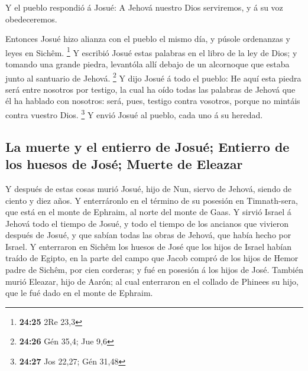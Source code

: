  Y el pueblo respondió á Josué: A Jehová nuestro Dios
serviremos, y á su voz obedeceremos.

 Entonces Josué hizo alianza con el pueblo el mismo día,
y púsole ordenanzas y leyes en Sichêm. \footnote{\textbf{24:25} 2Re 23,3}
 Y escribió Josué estas palabras en el libro de la ley de
Dios; y tomando una grande piedra, levantóla allí debajo de un
alcornoque que estaba junto al santuario de Jehová. \footnote{\textbf{24:26}
  Gén 35,4; Jue 9,6}  Y dijo Josué á todo el pueblo: He
aquí esta piedra será entre nosotros por testigo, la cual ha oído todas
las palabras de Jehová que él ha hablado con nosotros: será, pues,
testigo contra vosotros, porque no mintáis contra vuestro Dios.
\footnote{\textbf{24:27} Jos 22,27; Gén 31,48}  Y envió
Josué al pueblo, cada uno á su heredad.

\hypertarget{la-muerte-y-el-entierro-de-josuuxe9-entierro-de-los-huesos-de-josuxe9-muerte-de-eleazar}{%
\subsection{La muerte y el entierro de Josué; Entierro de los huesos de
José; Muerte de
Eleazar}\label{la-muerte-y-el-entierro-de-josuuxe9-entierro-de-los-huesos-de-josuxe9-muerte-de-eleazar}}

 Y después de estas cosas murió Josué, hijo de Nun,
siervo de Jehová, siendo de ciento y diez años.  Y
enterráronlo en el término de su posesión en Timnath-sera, que está en
el monte de Ephraim, al norte del monte de Gaas.  Y
sirvió Israel á Jehová todo el tiempo de Josué, y todo el tiempo de los
ancianos que vivieron después de Josué, y que sabían todas las obras de
Jehová, que había hecho por Israel.  Y enterraron en
Sichêm los huesos de José que los hijos de Israel habían traído de
Egipto, en la parte del campo que Jacob compró de los hijos de Hemor
padre de Sichêm, por cien corderas; y fué en posesión á los hijos de
José.  También murió Eleazar, hijo de Aarón; al cual
enterraron en el collado de Phinees su hijo, que le fué dado en el monte
de Ephraim.
